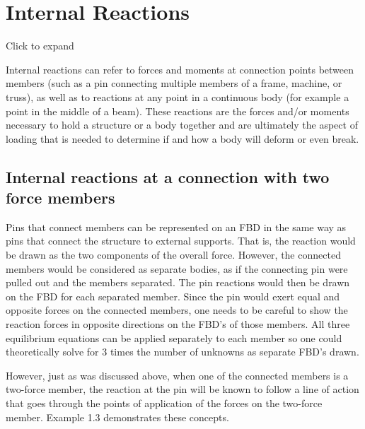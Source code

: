 \documentclass[
  letterpaper,
  DIV=11,
  numbers=noendperiod]{scrreprt}
\begin{document}
\section{Internal Reactions}\label{sec-1.2}

Click to expand

Internal reactions can refer to forces and moments at connection points
between members (such as a pin connecting multiple members of a frame,
machine, or truss), as well as to reactions at any point in a continuous
body (for example a point in the middle of a beam). These reactions are
the forces and/or moments necessary to hold a structure or a body
together and are ultimately the aspect of loading that is needed to
determine if and how a body will deform or even break.

\subsection{Internal reactions at a connection with two force
members}\label{internal-reactions-at-a-connection-with-two-force-members}

Pins that connect members can be represented on an FBD in the same way
as pins that connect the structure to external supports. That is, the
reaction would be drawn as the two components of the overall force.
However, the connected members would be considered as separate bodies,
as if the connecting pin were pulled out and the members separated. The
pin reactions would then be drawn on the FBD for each separated member.
Since the pin would exert equal and opposite forces on the connected
members, one needs to be careful to show the reaction forces in opposite
directions on the FBD's of those members. All three equilibrium
equations can be applied separately to each member so one could
theoretically solve for 3 times the number of unknowns as separate FBD's
drawn.

However, just as was discussed above, when one of the connected members
is a two-force member, the reaction at the pin will be known to follow a
line of action that goes through the points of application of the forces
on the two-force member. Example 1.3 demonstrates these concepts.
\end{document}
